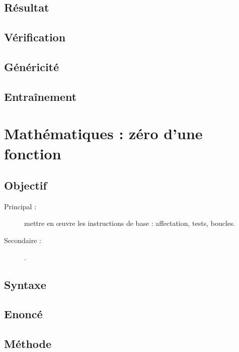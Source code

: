 \subsection{Résultat}\label{instructions:figures:resultat}

\subsection{Vérification}\label{instructions:figures:verification}

\subsection{Généricité}\label{instructions:figures:genericite}

\subsection{Entraînement}\label{instructions:figures:entrainement}

\section{Mathématiques : zéro d'une fonction}\label{instructions:maths}

\subsection{Objectif}\label{instructions:maths:objectif}
\begin{description}
\item[Principal : ] mettre en \oe uvre les instructions de base : affectation, tests, boucles.
\item[Secondaire :] .
\end{description}


\subsection{Syntaxe \python}\label{instructions:maths:python}

\subsection{Enoncé}\label{instructions:maths:enonce}

\subsection{Méthode}\label{instructions:maths:methode}


